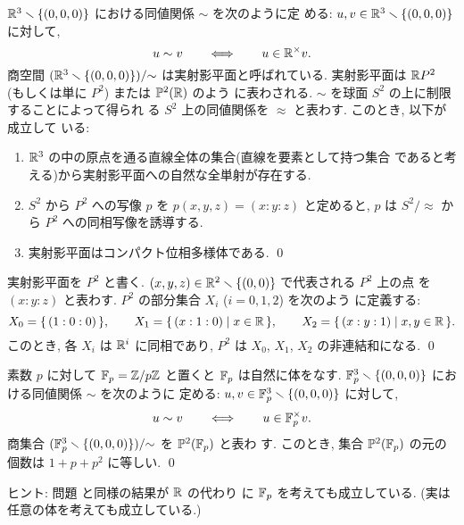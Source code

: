 \documentclass[12pt,twoside]{jarticle}
\def\Z{{\Bbb Z}} %
\def\R{{\Bbb R}} %
\def\P{{\Bbb P}}
\def\F{{\Bbb F}}
\begin{document}
\begin{question}[実射影平面]\label{q:proj-plane}
  $\R^3 \setminus \{(0,0,0)\}$ における同値関係 $\sim$ を次のように定
  める: $u,v \in \R^3 \setminus \{(0,0,0)\}$ に対して,
  \[
    u \sim v
    \qquad\Longleftrightarrow\qquad
    u \in \R^{\times} v.
  \]%
  商空間 $(\R^3 \setminus \{(0,0,0)\})/{\sim}$ は実射影平面と呼ばれている. %
  実射影平面は $\R P^2$ (もしくは単に $P^2$) または $\P^2(\R)$ のよう
  に表わされる.  $\sim$ を球面 $S^2$ の上に制限することによって得られ
  る $S^2$ 上の同値関係を $\approx$ と表わす. このとき, 以下が成立して
  いる: 
  \begin{enumerate}
  \item $\R^3$ の中の原点を通る直線全体の集合(直線を要素として持つ集合
    であると考える)から実射影平面への自然な全単射が存在する.
  \item $S^2$ から $P^2$ への写像 $p$ を $p(x,y,z)=(x:y:z)$ と定めると, %
    $p$ は $S^2/{\approx}$ から $P^2$ への同相写像を誘導する.
  \item 実射影平面はコンパクト位相多様体である.
    \qed
  \end{enumerate}
\end{question}

\begin{question}\label{q:P2cell}
  実射影平面を $P^2$ と書く. %
  $(x,y,z)\in\R^2\setminus\{(0,0)\}$ で代表される $P^2$ 上の点
  を $(x:y:z)$ と表わす. $P^2$ の部分集合 $X_i$ ($i=0,1,2$) を次のよう
  に定義する:
  \[
    X_0 = \{\, (1:0:0) \,\},
    \qquad
    X_1 = \{\, (x:1:0) \mid x \in \R\,\},
    \qquad
    X_2 = \{\, (x:y:1) \mid x, y \in \R \,\}.
  \]
  このとき, 各 $X_i$ は $\R^i$ に同相であり, %
  $P^2$ は $X_0$, $X_1$, $X_2$ の非連結和になる. \qed
\end{question}

\begin{question}[有限体上の射影平面]
  素数 $p$ に対して $\F_p = \Z/p\Z$ と置くと $\F_p$ は自然に体をなす.
  $\F_p^3 \setminus \{(0,0,0)\}$ における同値関係 $\sim$ を次のように
  定める: $u,v \in \F_p^3 \setminus \{(0,0,0)\}$ に対して,
  \[
    u \sim v
    \qquad\Longleftrightarrow\qquad
    u \in \F_p^{\times} v.
  \]%
  商集合 $(\F_p^3 \setminus \{(0,0,0)\})/{\sim}$ を $\P^2(\F_p)$ と表わ
  す. このとき, 集合 $\P^2(\F_p)$ の元の個数は $1 + p + p^2$ に等しい. 
  \qed
\end{question}

\noindent ヒント: 問題  と同様の結果が $\R$ の代わり
に $\F_p$ を考えても成立している. (実は任意の体を考えても成立している.)
\end{document}
